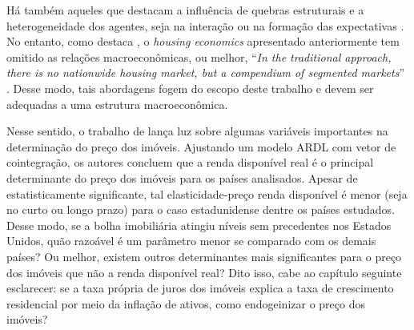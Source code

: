 Há também aqueles que destacam a influência de 
quebras estruturais \cite{miles_bubbles_2015} e a 
heterogeneidade dos agentes, seja na 
interação \cites{wang_over-confidence_2000}{wang_overbuilding:_2000}{hardman_neighbors_2004} ou na 
formação das expectativas \cites{burnside_understanding_2016}{ascari_booms_2018}. 
No entanto, como destaca \textcite{leung_macroeconomics_2004}, o \textit{housing economics} apresentado anteriormente tem omitido as relações macroeconômicas, ou melhor, ``\textit{In the traditional approach, there is no nationwide housing market, but a compendium of segmented markets}'' \cite[p.335]{arestis_u.s._2008}. Desse modo, tais abordagens fogem do escopo deste trabalho e devem ser adequadas a uma estrutura macroeconômica. 

Nesse sentido, o trabalho de \textcite{arestis_economic_2019} lança luz sobre algumas variáveis importantes na determinação do preço dos imóveis. Ajustando um modelo ARDL com vetor de cointegração, os autores concluem que a renda disponível real é o principal determinante do preço dos imóveis para os países analisados. Apesar de estatisticamente significante, tal elasticidade-preço renda disponível é menor   (seja no curto ou longo prazo) para o caso estadunidense dentre os países estudados.
Desse modo, se a bolha imobiliária atingiu níveis sem precedentes nos Estados Unidos, quão razoável é um parâmetro menor se comparado com os demais países? Ou melhor, existem outros determinantes mais significantes para o preço dos imóveis que não a renda disponível real? Dito isso, cabe ao capítulo seguinte esclarecer: se a taxa própria de juros dos imóveis explica a taxa de crescimento residencial por meio da inflação de ativos, como endogeinizar o preço dos imóveis?

